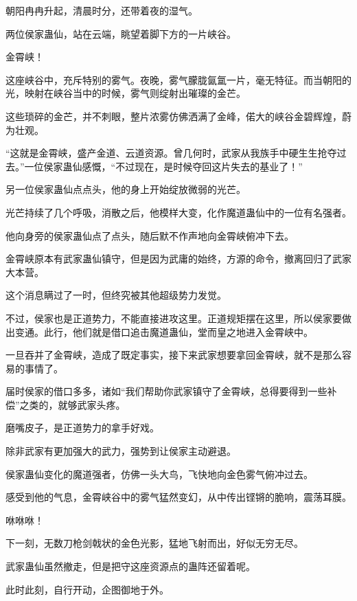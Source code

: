 
\begin{this_body}



朝阳冉冉升起，清晨时分，还带着夜的湿气。

两位侯家蛊仙，站在云端，眺望着脚下方的一片峡谷。

金霄峡！

这座峡谷中，充斥特别的雾气。夜晚，雾气朦胧氤氲一片，毫无特征。而当朝阳的光，映射在峡谷当中的时候，雾气则绽射出璀璨的金芒。

这些琐碎的金芒，并不刺眼，整片浓雾仿佛洒满了金峰，偌大的峡谷金碧辉煌，蔚为壮观。

“这就是金霄峡，盛产金道、云道资源。曾几何时，武家从我族手中硬生生抢夺过去。”一位侯家蛊仙感慨，“不过现在，是时候夺回这片失去的基业了！”

另一位侯家蛊仙点点头，他的身上开始绽放微弱的光芒。

光芒持续了几个呼吸，消散之后，他模样大变，化作魔道蛊仙中的一位有名强者。

他向身旁的侯家蛊仙点了点头，随后默不作声地向金霄峡俯冲下去。

金霄峡原本有武家蛊仙镇守，但是因为武庸的始终，方源的命令，撤离回归了武家大本营。

这个消息瞒过了一时，但终究被其他超级势力发觉。

不过，侯家也是正道势力，不能直接进攻这里。正道规矩摆在这里，所以侯家要做出变通。此行，他们就是借口追击魔道蛊仙，堂而皇之地进入金霄峡中。

一旦吞并了金霄峡，造成了既定事实，接下来武家想要拿回金霄峡，就不是那么容易的事情了。

届时侯家的借口多多，诸如“我们帮助你武家镇守了金霄峡，总得要得到一些补偿”之类的，就够武家头疼。

磨嘴皮子，是正道势力的拿手好戏。

除非武家有更加强大的武力，强势到让侯家主动避退。

侯家蛊仙变化的魔道强者，仿佛一头大鸟，飞快地向金色雾气俯冲过去。

感受到他的气息，金霄峡谷中的雾气猛然变幻，从中传出铿锵的脆响，震荡耳膜。

咻咻咻！

下一刻，无数刀枪剑戟状的金色光影，猛地飞射而出，好似无穷无尽。

武家蛊仙虽然撤走，但是把守这座资源点的蛊阵还留着呢。

此时此刻，自行开动，企图御地于外。


\end{this_body}
